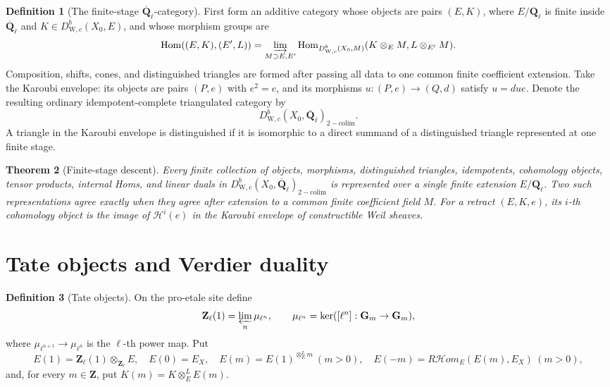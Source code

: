 \documentclass[10pt]{article}
\newtheorem{theorem}{Theorem}[section]
\theoremstyle{definition}
\newtheorem{definition}[theorem]{Definition}
\newcommand{\Ql}{\mathbf Q_\ell}
\newcommand{\Qlb}{\overline{\mathbf Q}_\ell}
\newcommand{\WeilD}{D^b_{\mathrm W,c}}
\newcommand{\RHom}{R\mathcal Hom}
\begin{document}
\begin{definition}[The finite-stage \(\Qlb\)-category]
First form an additive category whose objects are pairs \((E,K)\), where
\(E/\Ql\) is finite inside \(\Qlb\) and \(K\in\WeilD(X_0,E)\), and whose
morphism groups are
\[
 \operatorname{Hom}((E,K),(E',L))
 =\varinjlim_{M\supset E,E'}
 \operatorname{Hom}_{\WeilD(X_0,M)}
     (K\otimes_E M,L\otimes_{E'}M).
\]
Composition, shifts, cones, and distinguished triangles are formed after
passing all data to one common finite coefficient extension.  Take the
Karoubi envelope: its objects are pairs \((P,e)\) with \(e^2=e\), and its
morphisms \(u:(P,e)\to(Q,d)\) satisfy \(u=due\).  Denote the resulting
ordinary idempotent-complete triangulated category by
\[
                  \WeilD(X_0,\Qlb)_{\mathrm{2-colim}}.
\]
A triangle in the Karoubi envelope is distinguished if it is isomorphic to
a direct summand of a distinguished triangle represented at one finite
stage.
\end{definition}

\begin{theorem}[Finite-stage descent]
Every finite collection of objects, morphisms, distinguished triangles,
idempotents, cohomology objects, tensor products, internal Homs, and linear
duals in
\(\WeilD(X_0,\Qlb)_{\mathrm{2-colim}}\) is represented over a single finite
extension \(E/\Ql\).  Two such representations agree exactly when they
agree after extension to a common finite coefficient field \(M\).  For a retract
\((E,K,e)\), its \(i\)-th cohomology object is the image of
\(\mathcal H^i(e)\) in the Karoubi envelope of constructible Weil sheaves.
\end{theorem}

\section{Tate objects and Verdier duality}

\begin{definition}[Tate objects]
On the pro-etale site define
\[
 \mathbf Z_\ell(1)=\varprojlim_n\mu_{\ell^n},
 \qquad
 \mu_{\ell^n}=\ker([\ell^n]:\mathbf G_m\to\mathbf G_m),
\]
where \(\mu_{\ell^{n+1}}\to\mu_{\ell^n}\) is the \(\ell\)-th power map.
Put
\[
 E(1)=\mathbf Z_\ell(1)\otimes_{\mathbf Z_\ell}E,
 \quad E(0)=E_X,
 \quad E(m)=E(1)^{\otimes_E^L m}\ (m>0),
 \quad E(-m)=\RHom_E(E(m),E_X)\ (m>0),
\]
and, for every \(m\in\mathbf Z\), put
\(K(m)=K\otimes_E^L E(m)\).
\end{definition}
\end{document}
